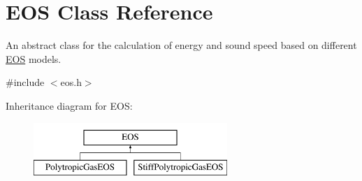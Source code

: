 \hypertarget{classEOS}{\section{E\-O\-S Class Reference}
\label{classEOS}
}


An abstract class for the calculation of energy and sound speed based on different \hyperlink{classEOS}{E\-O\-S} models.  




{\ttfamily \#include $<$eos.\-h$>$}

Inheritance diagram for E\-O\-S\-:\begin{figure}[H]
\begin{center}
\leavevmode
\includegraphics[height=2.000000cm]{classEOS}
\end{center}
\end{figure}
